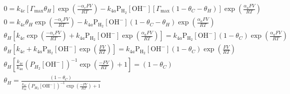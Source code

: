 \documentclass[12pt]{article}
\begin{document}
  \begin{gather*}
    0 = k_{4c} \left[\Gamma_{\max} \theta_H \right] \exp{ \left( \frac{-\alpha_c F V}{RT} \right)}
    - k_{4a} \text{P}_{\text{H}_2} \left[\text{OH}^- \right] \left[\Gamma_{\max} (1 - \theta_C - \theta_H) \right]
    \exp{\left( \frac{\alpha_a F V}{RT} \right)}
    \\
    0 = k_{4c} \theta_H \exp{ \left( \frac{-\alpha_c F V}{RT} \right)}
    - k_{4a} \text{P}_{\text{H}_2} \left[\text{OH}^- \right] (1 - \theta_C - \theta_H) \exp{\left( \frac{\alpha_a F V}{RT} \right)}
    \\
    \theta_H \left[ k_{4c} \exp{ \left( \frac{-\alpha_c F V}{RT} \right)} +
    k_{4a} \text{P}_{\text{H}_2} \left[\text{OH}^- \right] \exp{\left( \frac{\alpha_a F V}{RT} \right)} \right] =
    k_{4a} \text{P}_{\text{H}_2} \left[\text{OH}^- \right] (1 - \theta_C) \exp{\left( \frac{\alpha_a F V}{RT} \right)}
    \\
    \theta_H \left[ k_{4c} +
    k_{4a} \text{P}_{\text{H}_2} \left[\text{OH}^- \right] \exp{\left( \frac{ F V}{RT} \right)} \right] =
    k_{4a} \text{P}_{\text{H}_2} \left[\text{OH}^- \right] (1 - \theta_C) \exp{\left( \frac{F V}{RT} \right)}
    \\
    \theta_H \left[ \frac{k_{4c}}{k_{4a}} \left(P_{H_2} \left[\text{OH}^- \right] \right)^{-1} \exp{\left( \frac{ - F V}{RT} \right)} + 1 \right] =
    (1 - \theta_C)
    \\
    \theta_H = \frac{(1 - \theta_C)} {\frac{k_{4c}}{k_{4a}} \left(P_{H_2} \left[\text{OH}^- \right] \right)^{-1} \exp{\left( \frac{ - F V}{RT} \right)} + 1}
  \end{gather*}
\end{document}
